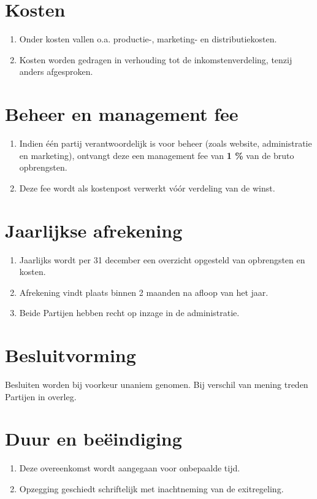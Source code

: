 \documentclass[11pt]{article}
\begin{document}
\section{Kosten} 

\begin{enumerate} 
    \item Onder kosten vallen o.a. productie-, marketing- en distributiekosten. 
    \item Kosten worden gedragen in verhouding tot de inkomstenverdeling, tenzij anders afgesproken. 
\end{enumerate} 

\section{Beheer en management fee} 

\begin{enumerate} 
    \item Indien één partij verantwoordelijk is voor beheer (zoals website, administratie en marketing), ontvangt deze een management fee van \textbf{1 \%} van de bruto opbrengsten. 
    \item Deze fee wordt als kostenpost verwerkt vóór verdeling van de winst. 
\end{enumerate} 

\section{Jaarlijkse afrekening} 

\begin{enumerate} 
    \item Jaarlijks wordt per 31 december een overzicht opgesteld van opbrengsten en kosten. 
    \item Afrekening vindt plaats binnen 2 maanden na afloop van het jaar. 
    \item Beide Partijen hebben recht op inzage in de administratie. 
\end{enumerate} 

\section{Besluitvorming} Besluiten worden bij voorkeur unaniem genomen. Bij verschil van mening treden Partijen in overleg. 

\section{Duur en beëindiging} 
\begin{enumerate} 
    \item Deze overeenkomst wordt aangegaan voor onbepaalde tijd. 
    \item Opzegging geschiedt schriftelijk met inachtneming van de exitregeling. 
\end{enumerate} 
\end{document}

